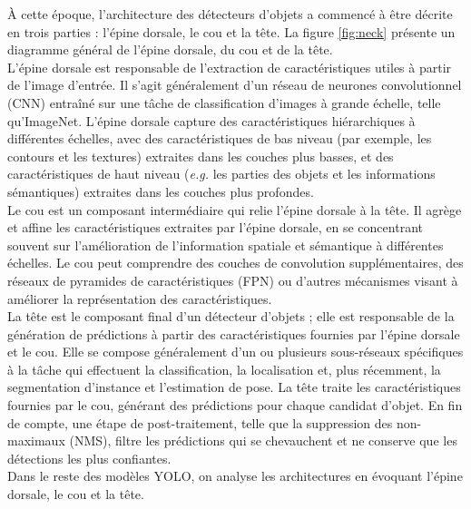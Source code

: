 \documentclass{article}
\begin{document}
À cette époque, l'architecture des détecteurs d'objets a commencé à être décrite en trois parties : l'épine dorsale, le cou et la tête. La figure \ref{fig:neck} présente un diagramme général de l'épine dorsale, du cou et de la tête.
\vspace{.2cm}\\
L'épine dorsale est responsable de l'extraction de caractéristiques utiles à partir de l'image d'entrée. Il s'agit généralement d'un réseau de neurones convolutionnel (CNN) entraîné sur une tâche de classification d'images à grande échelle, telle qu'ImageNet. L'épine dorsale capture des caractéristiques hiérarchiques à différentes échelles, avec des caractéristiques de bas niveau (par exemple, les contours et les textures) extraites dans les couches plus basses, et des caractéristiques de haut niveau (\textit{e.g.} les parties des objets et les informations sémantiques) extraites dans les couches plus profondes.
\vspace{.2cm}\\
Le cou est un composant intermédiaire qui relie l'épine dorsale à la tête. Il agrège et affine les caractéristiques extraites par l'épine dorsale, en se concentrant souvent sur l'amélioration de l'information spatiale et sémantique à différentes échelles. Le cou peut comprendre des couches de convolution supplémentaires, des réseaux de pyramides de caractéristiques (FPN) \cite{49} ou d'autres mécanismes visant à améliorer la représentation des caractéristiques.
\vspace{.2cm}\\
La tête est le composant final d'un détecteur d'objets ; elle est responsable de la génération de prédictions à partir des caractéristiques fournies par l'épine dorsale et le cou. Elle se compose généralement d'un ou plusieurs sous-réseaux spécifiques à la tâche qui effectuent la classification, la localisation et, plus récemment, la segmentation d'instance et l'estimation de pose. La tête traite les caractéristiques fournies par le cou, générant des prédictions pour chaque candidat d'objet. En fin de compte, une étape de post-traitement, telle que la suppression des non-maximaux (NMS), filtre les prédictions qui se chevauchent et ne conserve que les détections les plus confiantes.
\vspace{.2cm}\\
Dans le reste des modèles YOLO, on analyse les architectures en évoquant l'épine dorsale, le cou et la tête.
\end{document}
